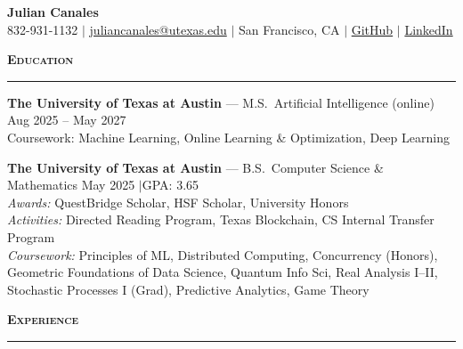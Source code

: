 \documentclass[letterpaper,10.5pt]{article}
\renewcommand{\section}[1]{%
  \vspace{0.5em}%
  {\normalsize\bfseries\scshape #1}%
  \vspace{-0.5em}%
  \par\noindent\rule{\textwidth}{0.4pt}%
  \vspace{0.15em}%
}
\begin{document}
\begin{center}
  {\large\bfseries Julian Canales} \\[2pt]
  {\small 832-931-1132 \enspace$\vert$\enspace
  \href{mailto:juliancanales@utexas.edu}{juliancanales@utexas.edu} \enspace$\vert$\enspace
  San Francisco, CA \enspace$\vert$\enspace
  \href{https://github.com/juliancanaless}{GitHub} \enspace$\vert$\enspace
  \href{https://www.linkedin.com/in/juliancanales05/}{LinkedIn}}
\end{center}

\section{Education}

{\small
\textbf{The University of Texas at Austin} --- M.S.\ Artificial Intelligence (online) \hfill Aug 2025 -- May 2027 \\
Coursework: Machine Learning, Online Learning \& Optimization, Deep Learning

\vspace{3pt}
\textbf{The University of Texas at Austin} --- B.S.\ Computer Science \& Mathematics \hfill May 2025 \enspace$\vert$\enspace GPA: 3.65 \\
\textit{Awards:} QuestBridge Scholar, HSF Scholar, University Honors \\
\textit{Activities:} Directed Reading Program, Texas Blockchain, CS Internal Transfer Program \\
\textit{Coursework:} Principles of ML, Distributed Computing, Concurrency (Honors), Geometric Foundations of Data Science, Quantum Info Sci, Real Analysis I--II, Stochastic Processes I (Grad), Predictive Analytics, Game Theory
}

\section{Experience}
\end{document}
